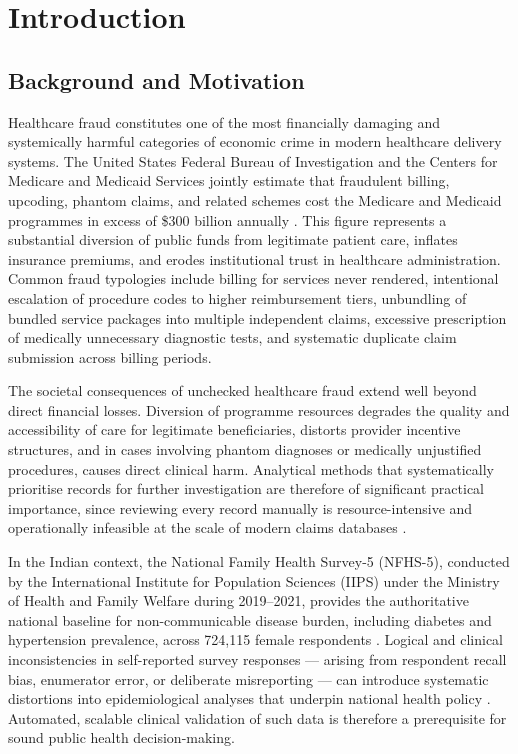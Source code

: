 \chapter{Introduction}
\label{ch:introduction}

\section{Background and Motivation}
\label{sec:background}

Healthcare fraud constitutes one of the most financially damaging and systemically harmful categories of economic crime in modern healthcare delivery systems. The United States Federal Bureau of Investigation and the Centers for Medicare and Medicaid Services jointly estimate that fraudulent billing, upcoding, phantom claims, and related schemes cost the Medicare and Medicaid programmes in excess of \$300 billion annually \cite{b16}. This figure represents a substantial diversion of public funds from legitimate patient care, inflates insurance premiums, and erodes institutional trust in healthcare administration. Common fraud typologies include billing for services never rendered, intentional escalation of procedure codes to higher reimbursement tiers, unbundling of bundled service packages into multiple independent claims, excessive prescription of medically unnecessary diagnostic tests, and systematic duplicate claim submission across billing periods.

The societal consequences of unchecked healthcare fraud extend well beyond direct financial losses. Diversion of programme resources degrades the quality and accessibility of care for legitimate beneficiaries, distorts provider incentive structures, and in cases involving phantom diagnoses or medically unjustified procedures, causes direct clinical harm. Analytical methods that systematically prioritise records for further investigation are therefore of significant practical importance, since reviewing every record manually is resource-intensive and operationally infeasible at the scale of modern claims databases \cite{b1}.

In the Indian context, the National Family Health Survey-5 (NFHS-5), conducted by the International Institute for Population Sciences (IIPS) under the Ministry of Health and Family Welfare during 2019--2021, provides the authoritative national baseline for non-communicable disease burden, including diabetes and hypertension prevalence, across 724,115 female respondents \cite{b14}. Logical and clinical inconsistencies in self-reported survey responses --- arising from respondent recall bias, enumerator error, or deliberate misreporting --- can introduce systematic distortions into epidemiological analyses that underpin national health policy \cite{b15}. Automated, scalable clinical validation of such data is therefore a prerequisite for sound public health decision-making.


